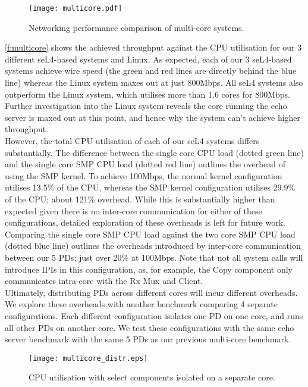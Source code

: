 \begin{figure}[H]
    \centering
    \texttt{[image: multicore.pdf]}
    \caption{Networking performance comparison of multi-core systems.}
    \label{f:multicore}
\end{figure}

\autoref{f:multicore} shows the achieved throughput against the CPU utilisation for our 3 different seL4-based systems and Linux. 
As expected, each of our 3 seL4-based systems achieve wire speed (the green and red lines are directly behind the blue line)
whereas the Linux system maxes out at just 800Mbps. All seL4 systems also outperform the Linux system, which utilises more than
1.6 cores for 800Mbps. Further investigation into the Linux system reveals the core running the echo server is maxed out at 
this point, and hence why the system can't achieve higher throughput. \\

However, the total CPU utilisation of each of our seL4 systems differs substantially. 
The difference between the single core CPU load (dotted green line) and the single core SMP CPU load (dotted red line) 
outlines the overhead of using the SMP kernel. To achieve 100Mbps, the normal kernel configuration utilises 13.5\% of the CPU, whereas
the SMP kernel configuration utilises 29.9\% of the CPU; about 121\% overhead. While this is substantially higher than expected given
there is no inter-core communication for either of these configurations, detailed
exploration of these overheads is left for future work. 
Comparing the single core SMP CPU load against the two core SMP CPU load (dotted blue line) outlines the overheads introduced by
inter-core communication between our 5 PDs; just over 20\% at 100Mbps. Note that not all system calls will introduce IPIs in
this configuration, as, for example, the Copy component only communicates intra-core with the Rx Mux and Client. \\

Ultimately, distributing PDs across different cores will incur different overheads. We explore these overheads with another benchmark
comparing 4 separate configurations. Each different configuration isolates one PD on one core, and runs all other PDs on another core. 
We test these configurations with the same echo server benchmark with the same 5 PDs as our previous multi-core benchmark.

\begin{figure}[H]
    \centering
    \texttt{[image: multicore\_distr.eps]}
    \caption{CPU utilisation with select components isolated on a separate core.}
    \label{f:multicore_distr}
\end{figure}

